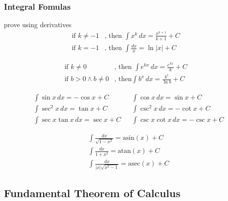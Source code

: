 		\subsubsection{Integral Fomulas}
			\begin{theorem}[Power]
				prove using derivatives
				\begin{align*}
					\text{if } k\ne-1&\text{, then }\int x^k\,dx=\frac{x^{k+1}}{k+1}+C\\
					\text{if } k=-1&\text{, then }\displaystyle\int\frac{dx}x=\ln|x|+C
				\end{align*}
			\end{theorem}
			\begin{theorem}[Exponential]
				\begin{align*}
					\text{if }k\ne0&\text{, then }\int e^{kx}\,dx=\frac{e^{kx}}k+C\\
					\text{if }b>0\land b\ne0&\text{, then}\int b^x\,dx=\frac{b^x}{\ln b}+C
				\end{align*}
			\end{theorem}
			\begin{theorem}[Trigonometric]
				\begin{align*}
					&\int\sin x\,dx=-\cos x+C&&\int\cos x\,dx=\sin x+C\\
					&\int\sec^2x\,dx=\tan x+C&&\int\csc^2x\,dx=-\cot x+C\\
					&\int\sec x\tan x\,dx=\sec x+C&&\int\csc x\cot x\,dx=-\csc x+C
				\end{align*}
			\end{theorem}
			\begin{theorem}[ArcTrigonometric]
				\begin{align*}
					&\int\frac{dx}{\sqrt{1-x^2}}=\mathrm{asin}(x)+C\\
					&\int\frac{dx}{1 + x^2}=\mathrm{atan}(x)+C\\
					&\int\frac{dx}{|x|\sqrt{x^2-1}}=\mathrm{asec}(x)+C
				\end{align*}
			\end{theorem}
	\subsection{Fundamental Theorem of Calculus}
